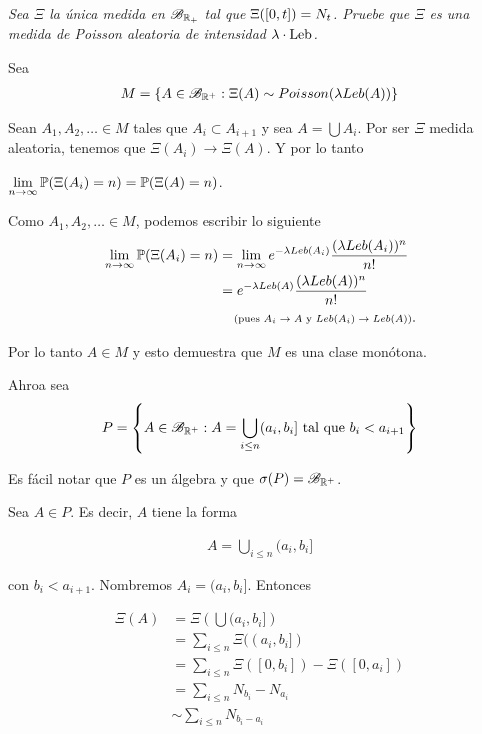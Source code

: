 \emph{
	Sea $\Xi$ la \'unica medida en $\mc{B}_{\re_+}$ tal que $\imf{\Xi}{[0,t]}=N_t$. Pruebe que 
	$\Xi$ es una medida de Poisson aleatoria de intensidad $\lambda \cdot\leb$.
}

\afterstatement\pn

Sea
\begin{align}
    M = \left\{ A \in \B_{\R^+} : \Xi(A) \sim Poisson(\lambda Leb(A)) \right\}
\end{align}

Sean $A_1, A_2, \dots \in M$ tales que $A_i \subset A_{i+1}$ y sea $A = \bigcup A_i$. Por ser $\Xi$ medida
aleatoria, tenemos que $\Xi(A_i) \longrightarrow \Xi(A)$. Y por lo tanto \par
$\lim\limits_{n \rightarrow \infty} \P(\Xi(A_i) = n) = \P(\Xi(A) = n)$.\pn

Como $A_1, A_2, \dots \in M$, podemos escribir lo siguiente
\begin{align}
    \lim_{n \rightarrow \infty} \P(\Xi(A_i) = n)    &=  \lim_{n \rightarrow \infty} e^{-\lambda Leb(A_i)} \frac{(\lambda Leb(A_i))^n}{n!}       \\
                                                    &=  e^{-\lambda Leb(A)} \frac{(\lambda Leb(A))^n}{n!}                                       \\
                                                    &\comment{pues $A_i \rightarrow A$ y $Leb(A_i) \rightarrow Leb(A)$}.
\end{align}

Por lo tanto $A \in M$ y esto demuestra que $M$ es una clase monótona.\pn

Ahroa sea
\begin{align}
    P = \left\{  A \in \B_{\R^+} : A = \bigcup_{ i  \leq n } (a_i, b_i] \text{ tal que } b_i < a_{i+1} \right\}
\end{align}\pn

Es fácil notar que $P$ es un álgebra y que $\sigma(P) = \B_{\R^+}$.\pn

Sea $A \in P$. Es decir, $A$ tiene la forma

\begin{align}
    A = \bigcup_{ i  \leq n } (a_i, b_i]
\end{align}

con $b_i < a_{i+1}$. Nombremos $A_i = (a_i, b_i]$. Entonces

\begin{align}
    \Xi(A)  &=      \Xi\left(\bigcup (a_i, b_i] \right)                         \\
            &=      \sum_{i \leq n}     \Xi((a_i, b_i])                         \\
            &=      \sum_{i \leq n}     \Xi([0, b_i])  -\Xi([0, a_i])           \\
            &=      \sum_{i \leq n}     N_{b_i}  -  N_{a_i}                     \\
            &\sim   \sum_{i \leq n}     N_{b_i - a_i} 
\end{align}\pn

